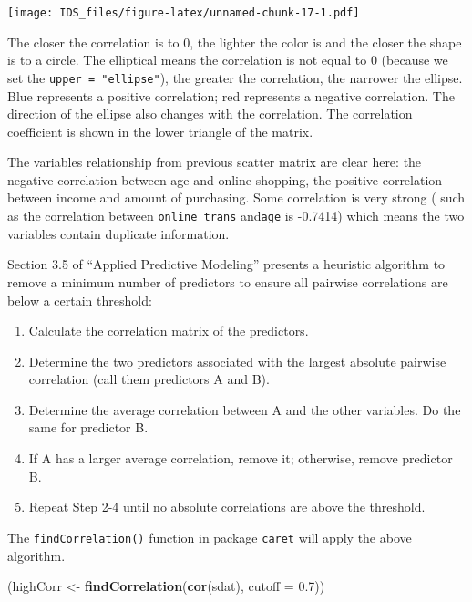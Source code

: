 \documentclass[12pt,]{krantz}
\makeatletter
\newenvironment{Shaded}{\begin{snugshade}}{\end{snugshade}}
\newcommand{\DataTypeTok}[1]{\textcolor[rgb]{0.27,0.27,0.27}{#1}}
\newcommand{\FloatTok}[1]{\textcolor[rgb]{0.06,0.06,0.06}{#1}}
\newcommand{\KeywordTok}[1]{\textcolor[rgb]{0.27,0.27,0.27}{\textbf{#1}}}
\newcommand{\NormalTok}[1]{#1}
\newcommand{\StringTok}[1]{\textcolor[rgb]{0.5,0.5,0.5}{#1}}
\providecommand{\tightlist}{%
  \setlength{\itemsep}{0pt}\setlength{\parskip}{0pt}}
\renewenvironment{quote}{\begin{VF}}{\end{VF}}
\newenvironment{kframe}{%
\medskip{}
\setlength{\fboxsep}{.8em}
 \def\at@end@of@kframe{}%
 \ifinner\ifhmode%
  \def\at@end@of@kframe{\end{minipage}}%
  \begin{minipage}{\columnwidth}%
 \fi\fi%
 \def\FrameCommand##1{\hskip\@totalleftmargin \hskip-\fboxsep
 \colorbox{shadecolor}{##1}\hskip-\fboxsep
     \hskip-\linewidth \hskip-\@totalleftmargin \hskip\columnwidth}%
 \MakeFramed {\advance\hsize-\width
   \@totalleftmargin\z@ \linewidth\hsize
   \@setminipage}}%
 {\par\unskip\endMakeFramed%
 \at@end@of@kframe}
\renewenvironment{Shaded}{\begin{kframe}}{\end{kframe}}
\makeatother
\begin{document}
\texttt{[image: IDS\_files/figure-latex/unnamed-chunk-17-1.pdf]}

The closer the correlation is to 0, the lighter the color is and the closer the shape is to a circle. The elliptical means the correlation is not equal to 0 (because we set the \texttt{upper\ =\ "ellipse"}), the greater the correlation, the narrower the ellipse. Blue represents a positive correlation; red represents a negative correlation. The direction of the ellipse also changes with the correlation. The correlation coefficient is shown in the lower triangle of the matrix.

The variables relationship from previous scatter matrix are clear here: the negative correlation between age and online shopping, the positive correlation between income and amount of purchasing. Some correlation is very strong ( such as the correlation between \texttt{online\_trans} and\texttt{age} is -0.7414) which means the two variables contain duplicate information.

Section 3.5 of ``Applied Predictive Modeling'' \citep{APM} presents a heuristic algorithm to remove a minimum number of predictors to ensure all pairwise correlations are below a certain threshold:

\begin{quote}
\begin{enumerate}
\def\labelenumi{(\arabic{enumi})}
\tightlist
\item
  Calculate the correlation matrix of the predictors.
\item
  Determine the two predictors associated with the largest absolute pairwise correlation (call them predictors A and B).
\item
  Determine the average correlation between A and the other variables. Do the same for predictor B.
\item
  If A has a larger average correlation, remove it; otherwise, remove predictor B.
\item
  Repeat Step 2-4 until no absolute correlations are above the threshold.
\end{enumerate}
\end{quote}

The \texttt{findCorrelation()} function in package \texttt{caret} will apply the above algorithm.

\begin{Shaded}
\begin{Highlighting}[]
\NormalTok{(highCorr <-}\StringTok{ }\KeywordTok{findCorrelation}\NormalTok{(}\KeywordTok{cor}\NormalTok{(sdat), }\DataTypeTok{cutoff =} \FloatTok{0.7}\NormalTok{))}
\end{Highlighting}
\end{Shaded}
\end{document}
